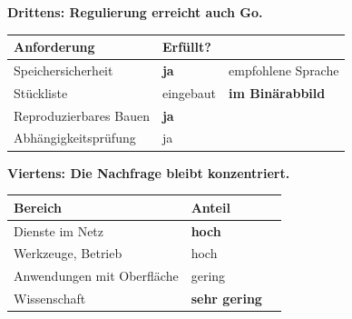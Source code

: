 \begin{aktuell}
\medskip
\textbf{Drittens: Regulierung erreicht auch Go.}

\begin{center}
\renewcommand{\arraystretch}{1.45}
\begin{tabular}{@{}P{3.4cm}P{1.8cm}P{2.6cm}@{}}
\toprule
\textbf{Anforderung} & \textbf{Erfüllt?} & \\
\midrule
Speichersicherheit & \textcolor{gruen}{\textbf{ja}} & \textcolor{gruen}{empfohlene Sprache}\\
Stückliste & \textcolor{gruen}{eingebaut} & \textbf{im Binärabbild}\\
Reproduzierbares Bauen & \textcolor{gruen}{\textbf{ja}} & \\
Abhängigkeits\-prüfung & \textcolor{gruen}{ja} & \\
\bottomrule
\end{tabular}
\end{center}

\begin{center}
\begin{minipage}{0.86\textwidth}
\end{minipage}
\end{center}

\medskip
\textbf{Viertens: Die Nachfrage bleibt konzentriert.}

\begin{center}
\renewcommand{\arraystretch}{1.45}
\begin{tabular}{@{}P{3.0cm}P{2.2cm}P{2.6cm}@{}}
\toprule
\textbf{Bereich} & \textbf{Anteil} & \\
\midrule
Dienste im Netz & \textcolor{gruen}{\textbf{hoch}} & \\
Werkzeuge, Betrieb & \textcolor{gruen}{hoch} & \\
Anwendungen mit Oberfläche & \textcolor{akzent}{gering} & \\
Wissenschaft & \textcolor{akzent}{\textbf{sehr gering}} & \\
\bottomrule
\end{tabular}
\end{center}

\begin{center}
\end{center}


\end{aktuell}
